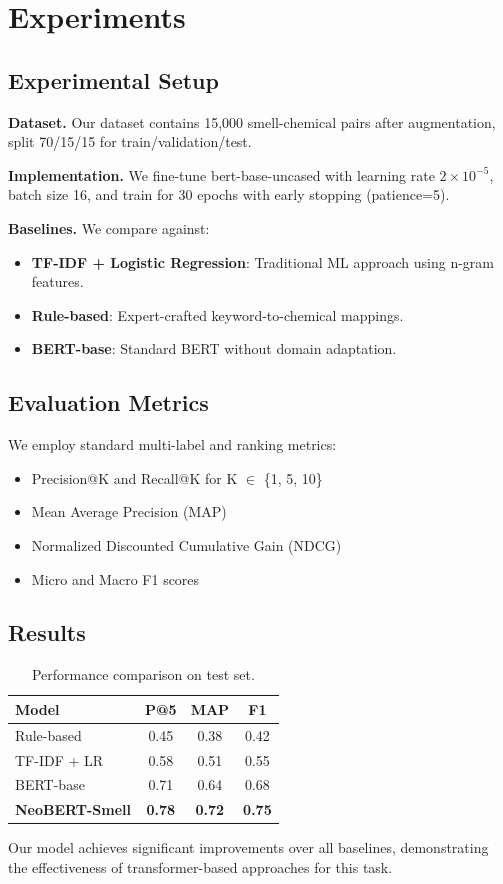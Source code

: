 \section{Experiments}

\subsection{Experimental Setup}

\textbf{Dataset.} Our dataset contains 15,000 smell-chemical pairs after augmentation, split 70/15/15 for train/validation/test.

\textbf{Implementation.} We fine-tune bert-base-uncased with learning rate $2 \times 10^{-5}$, batch size 16, and train for 30 epochs with early stopping (patience=5).

\textbf{Baselines.} We compare against:
\begin{itemize}
    \item \textbf{TF-IDF + Logistic Regression}: Traditional ML approach using n-gram features.
    \item \textbf{Rule-based}: Expert-crafted keyword-to-chemical mappings.
    \item \textbf{BERT-base}: Standard BERT without domain adaptation.
\end{itemize}

\subsection{Evaluation Metrics}

We employ standard multi-label and ranking metrics:
\begin{itemize}
    \item Precision@K and Recall@K for K $\in$ \{1, 5, 10\}
    \item Mean Average Precision (MAP)
    \item Normalized Discounted Cumulative Gain (NDCG)
    \item Micro and Macro F1 scores
\end{itemize}

\subsection{Results}

\begin{table}[h]
\centering
\begin{tabular}{lccc}
\toprule
\textbf{Model} & \textbf{P@5} & \textbf{MAP} & \textbf{F1} \\
\midrule
Rule-based & 0.45 & 0.38 & 0.42 \\
TF-IDF + LR & 0.58 & 0.51 & 0.55 \\
BERT-base & 0.71 & 0.64 & 0.68 \\
\textbf{NeoBERT-Smell} & \textbf{0.78} & \textbf{0.72} & \textbf{0.75} \\
\bottomrule
\end{tabular}
\caption{Performance comparison on test set.}
\end{table}

Our model achieves significant improvements over all baselines, demonstrating the effectiveness of transformer-based approaches for this task.
